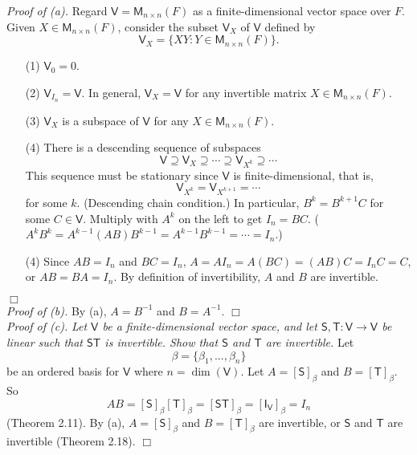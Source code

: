 \documentclass{article}
\begin{document}
\emph{Proof of (a).}
Regard $\mathsf{V} = \mathsf{M}_{n \times n}(F)$ as a finite-dimensional vector space over $F$.
Given $X \in \mathsf{M}_{n \times n}(F)$,
consider the subset $\mathsf{V}_X$ of $\mathsf{V}$ defined by
$$\mathsf{V}_X = \{ XY : Y \in \mathsf{M}_{n \times n}(F) \}.$$
\begin{enumerate}
\item[(1)]
$\mathsf{V}_0 = 0$.
\item[(2)]
$\mathsf{V}_{I_n} = \mathsf{V}$.
In general,
$\mathsf{V}_X = \mathsf{V}$ for any invertible matrix $X \in \mathsf{M}_{n \times n}(F)$.
\item[(3)]
$\mathsf{V}_X$ is a subspace of $\mathsf{V}$ for any $X \in \mathsf{M}_{n \times n}(F)$.
\item[(4)]
There is a descending sequence of subspaces
$$\mathsf{V}
  \supseteq \mathsf{V}_X
  \supseteq \cdots
  \supseteq \mathsf{V}_{X^k}
  \supseteq \cdots
$$
This sequence must be stationary since $\mathsf{V}$ is finite-dimensional,
that is,
$$\mathsf{V}_{X^k} = \mathsf{V}_{X^{k+1}} = \cdots$$ for some $k$.
(Descending chain condition.)
In particular, $B^k = B^{k+1}C$ for some $C \in \mathsf{V}$.
Multiply with $A^k$ on the left to get $I_n = BC$.
($A^k B^k = A^{k-1}(AB)B^{k-1} = A^{k-1}B^{k-1} = \cdots = I_n$.)
\item[(4)]
Since $AB = I_n$ and $BC  = I_n$,
$A = AI_n = A(BC) = (AB)C = I_nC = C$,
or $AB = BA = I_n$.
By definition of invertibility, $A$ and $B$ are invertible.
\end{enumerate}
$\Box$ \\

\emph{Proof of (b).}
By (a), $A = B^{-1}$ and $B = A^{-1}$.
$\Box$ \\

\emph{Proof of (c).}
\emph{Let $\mathsf{V}$ be a finite-dimensional vector space,
and let $\mathsf{S}, \mathsf{T}: \mathsf{V} \to \mathsf{V}$ be linear
such that $\mathsf{S}\mathsf{T}$ is invertible.
Show that $\mathsf{S}$ and $\mathsf{T}$ are invertible.}
Let
$$\beta = \{ \beta_1, ..., \beta_n \}$$
be an ordered basis for $\mathsf{V}$ where $n = \dim(\mathsf{V})$.
Let $A = [\mathsf{S}]_\beta$ and $B = [\mathsf{T}]_\beta$.
So
$$AB
= [\mathsf{S}]_\beta [\mathsf{T}]_\beta
= [\mathsf{S} \mathsf{T}]_\beta
= [\mathsf{I}_{\mathsf{V}} ]_\beta = I_n$$ (Theorem 2.11).
By (a), $A = [\mathsf{S}]_\beta$ and $B = [\mathsf{T}]_\beta$ are invertible,
or $\mathsf{S}$ and $\mathsf{T}$ are invertible (Theorem 2.18).
$\Box$ \\\\
\end{document}

